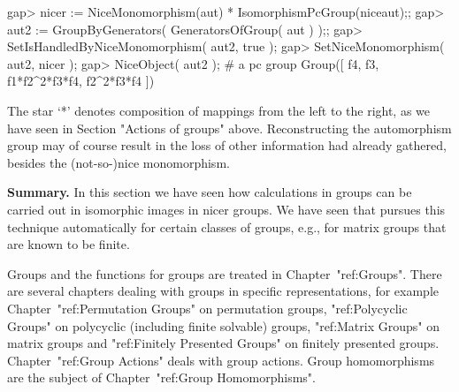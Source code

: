 \beginexample
gap> nicer := NiceMonomorphism(aut) * IsomorphismPcGroup(niceaut);;
gap> aut2 := GroupByGenerators( GeneratorsOfGroup( aut ) );;
gap> SetIsHandledByNiceMonomorphism( aut2, true );
gap> SetNiceMonomorphism( aut2, nicer );
gap> NiceObject( aut2 );  # a pc group
Group([ f4, f3, f1*f2^2*f3*f4, f2^2*f3*f4 ])
\endexample

The star `*' denotes composition of mappings  from the left to the right,
as we  have  seen in  Section "Actions of  groups" above.
Reconstructing the
automorphism group may of course result in the  loss of other information
{\GAP} had already gathered, besides the (not-so-)nice monomorphism.

%

{\bf Summary.}  In this section we have  seen  how calculations in groups
can be carried  out in isomorphic  images in  nicer groups. We  have seen
that {\GAP}  pursues this technique  automatically for certain classes of
groups, e.g., for matrix groups that are known to be finite.


Groups and the functions for groups are treated in Chapter~"ref:Groups".
There are several chapters dealing with groups in specific representations,
for example Chapter~"ref:Permutation Groups" on permutation groups,
"ref:Polycyclic Groups" on polycyclic (including finite solvable) groups,
"ref:Matrix Groups" on matrix groups and "ref:Finitely Presented Groups" on
finitely presented groups.
Chapter~"ref:Group Actions" deals with group actions. Group
homomorphisms are the subject of Chapter~"ref:Group Homomorphisms".


